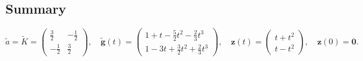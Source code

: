 \documentclass[11pt]{article}
\begin{document}
\subsection*{Summary}
\[
  \boxed{
    \widetilde{a} = \widetilde{K}
    = \begin{pmatrix}\tfrac{3}{2}&-\tfrac{1}{2}\\-\tfrac{1}{2}&\tfrac{3}{2}\end{pmatrix},
    \quad
    \widetilde{\mathbf{g}}(t)
    = \begin{pmatrix}1+t-\tfrac{5}{2}t^2-\tfrac{2}{3}t^3\\[4pt]
                     1-3t+\tfrac{3}{2}t^2+\tfrac{2}{3}t^3\end{pmatrix},
    \quad
    \mathbf{z}(t) = \begin{pmatrix}t+t^2\\t-t^2\end{pmatrix},
    \quad
    \mathbf{z}(0) = \mathbf{0}.
  }
\]
\end{document}
